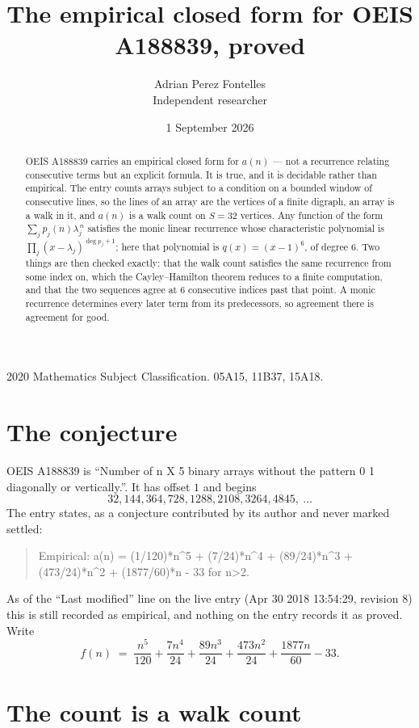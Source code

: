 \documentclass[11pt,a4paper]{article}
\title{The empirical closed form for OEIS A188839, proved}
\author{Adrian Perez Fontelles\\ \small Independent researcher}
\date{1 September 2026}
\theoremstyle{plain}
\theoremstyle{definition}
\begin{document}
\maketitle

\begin{abstract}
OEIS A188839 carries an empirical closed form for $a(n)$ --- not a recurrence relating
consecutive terms but an explicit formula. It is true, and it is decidable rather than
empirical. The entry counts arrays subject to a condition on a bounded window of consecutive lines, so the lines of an array are the
vertices of a finite digraph, an array is a walk in it, and $a(n)$ is a walk count on
$S=32$ vertices. Any function of the form $\sum_j p_j(n)\lambda_j^{\,n}$ satisfies the
monic linear recurrence whose characteristic polynomial is
$\prod_j(x-\lambda_j)^{\deg p_j+1}$; here that polynomial is $q(x)=(x-1)^{6}$, of degree
$6$. Two things are then checked exactly: that the walk count satisfies the same
recurrence from some index on, which the Cayley--Hamilton theorem reduces to a finite
computation, and that the two sequences agree at $6$ consecutive indices past that
point. A monic recurrence determines every later term from its predecessors, so agreement
there is agreement for good.
\end{abstract}

\noindent\small 2020 Mathematics Subject Classification. 05A15, 11B37, 15A18.\normalsize

\section{The conjecture}

OEIS A188839 is ``Number of n X 5 binary arrays without the pattern 0 1 diagonally or vertically.''. It has offset $1$ and begins
\[
32, 144, 364, 728, 1288, 2108, 3264, 4845,\ \dots
\]
The entry states, as a conjecture contributed by its author and never marked settled:
\begin{quote}
Empirical: a(n) = (1/120)*n\^{}5 + (7/24)*n\^{}4 + (89/24)*n\^{}3 + (473/24)*n\^{}2 + (1877/60)*n - 33 for n>2.
\end{quote}
As of the ``Last modified'' line on the live entry (Apr 30 2018 13:54:29, revision 8) this is still
recorded as empirical, and nothing on the entry records it as proved. Write
\[
f(n)\;=\;\frac{n^{5}}{120} + \frac{7 n^{4}}{24} + \frac{89 n^{3}}{24} + \frac{473 n^{2}}{24} + \frac{1877 n}{60} - 33.
\]

\section{The count is a walk count}
\end{document}
